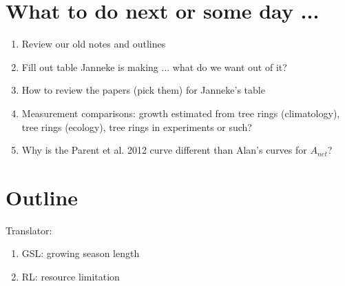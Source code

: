 \documentclass[11pt,letter]{article}
\begin{document}
\section{What to do next or some day ...}

\begin{enumerate}
\item Review our old notes and outlines
\item Fill out table Janneke is making ... what do we want out of it?
\item How to review the papers (pick them) for Janneke's table
\item Measurement comparisons: growth estimated from tree rings (climatology), tree rings (ecology), tree rings in experiments or such?
\item Why is the Parent et al. 2012 curve different than Alan's curves for $A_{net}$?
\end{enumerate}


\section{Outline}

Translator:
\begin{enumerate}
\item GSL: growing season length
\item RL: resource limitation
\end{enumerate}
\end{document}
